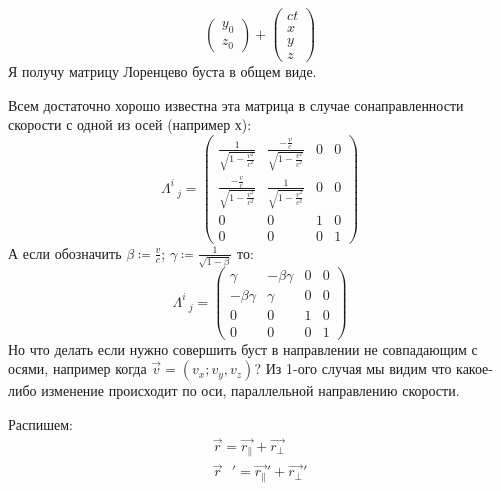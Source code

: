 \documentclass[12pt]{article}
\begin{document}
\begin{large}
\begin{equation}
\begin{pmatrix}
            y_0\\
            z_0
        \end{pmatrix}
        +
        \begin{pmatrix}
            ct\\
            x\\
            y\\
            z
        \end{pmatrix}
    \end{equation}
    Я получу матрицу Лоренцево буста в общем виде.
    \par Всем достаточно хорошо известна эта матрица в случае сонаправленности скорости с одной из осей (например х):
    \begin{equation}
        \Lambda^i_{\text{ }j} =
        \begin{pmatrix}
            \frac{1}{\sqrt{1-\frac{v^2}{c^2}}} & \frac{-\frac{v}{c}}{\sqrt{1-\frac{v^2}{c^2}}} & 0 & 0 \\
            \frac{-\frac{v}{c}}{\sqrt{1-\frac{v^2}{c^2}}} & \frac{1}{\sqrt{1-\frac{v^2}{c^2}}} & 0 & 0 \\
            0 & 0 & 1 & 0 \\
            0 & 0 & 0 & 1
        \end{pmatrix}
    \end{equation}
    А если обозначить $\beta \coloneqq \frac{v}{c}$; $\gamma \coloneqq \frac{1}{\sqrt{1 - \beta}}$ то:
    \begin{equation}
        \Lambda^i_{\text{ }j} =
        \begin{pmatrix}
            \gamma & -\beta \gamma & 0 & 0 \\
            -\beta \gamma & \gamma & 0 & 0 \\
            0 & 0 & 1 & 0 \\
            0 & 0 & 0 & 1
        \end{pmatrix}
    \end{equation}
    Но что делать если нужно совершить буст в направлении не совпадающим с осями, например когда $\vec{v} = (v_x; v_y, v_z)$?
    Из 1-ого случая мы видим что какое-либо изменение происходит по оси, параллельной направлению скорости.
    \par Распишем:
    \begin{equation}
    \begin{gathered}
        \vec{r} = \vec{r_{\parallel}} + \vec{r_\perp} \\
        \vec{r}\text{ }' = \vec{r_{\parallel}}' + \vec{r_\perp}'

\end{gathered}
\end{equation}
\end{large}
\end{document}
